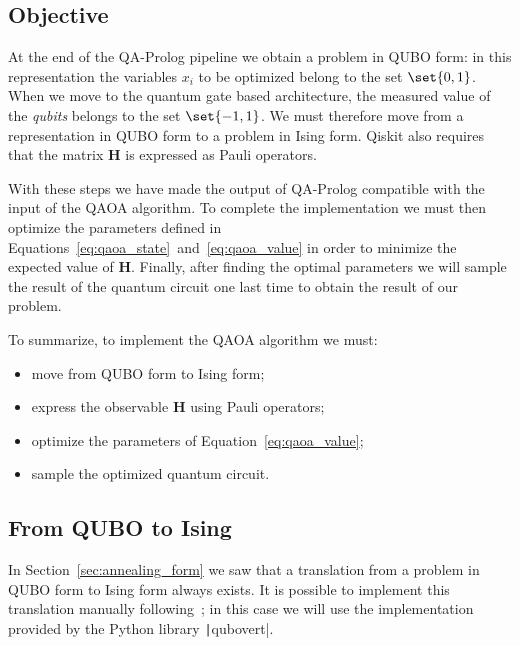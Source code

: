 \subsection{Objective}
At the end of the QA-Prolog pipeline we obtain a problem in QUBO form: in this representation the variables $x_i$ to be optimized belong to the set $\set{0, 1}$. When we move to the quantum gate based architecture, the measured value of the \emph{qubits} belongs to the set $\set{-1, 1}$. We must therefore move from a representation in QUBO form to a problem in Ising form. Qiskit also requires that the matrix $\mathbf{H}$ is expressed as Pauli operators.

With these steps we have made the output of QA-Prolog compatible with the input of the QAOA algorithm. To complete the implementation we must then optimize the parameters defined in Equations~\ref{eq:qaoa_state}~and~\ref{eq:qaoa_value} in order to minimize the expected value of $\mathbf{H}$. Finally, after finding the optimal parameters we will sample the result of the quantum circuit one last time to obtain the result of our problem.

To summarize, to implement the QAOA algorithm we must:
\begin{itemize}
	\item move from QUBO form to Ising form;
	\item express the observable $\mathbf{H}$ using Pauli operators;
	\item optimize the parameters of Equation~\ref{eq:qaoa_value};
	\item sample the optimized quantum circuit.
\end{itemize}

\subsection{From QUBO to Ising}
In Section~\ref{sec:annealing_form} we saw that a translation from a problem in QUBO form to Ising form always exists. It is possible to implement this translation manually following~\cite{bian2010ising}; in this case we will use the implementation provided by the Python library \texttt|qubovert|.

\begin{listing}[h]
	\caption{From QUBO form to Ising}
	\label{lst:qubo_ising}
\end{listing}

